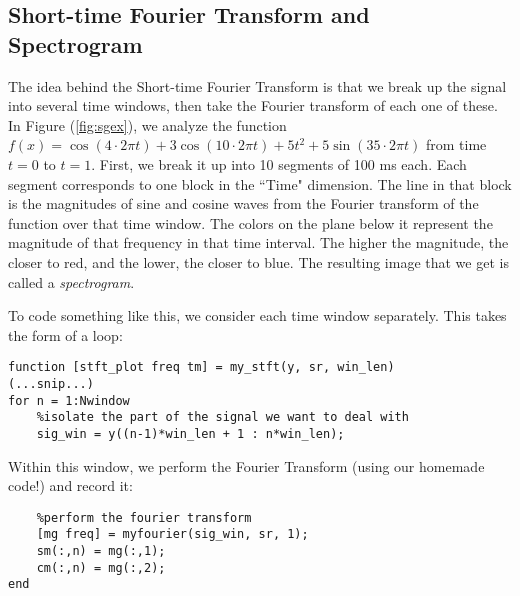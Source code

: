 \documentclass{article}
\begin{document}
\subsection{Short-time Fourier Transform and Spectrogram}
The idea behind the Short-time Fourier Transform is that we break up the signal into several time windows, then take the Fourier transform of each one of these.  In Figure (\ref{fig:sgex}), we analyze the function $f(x) = \cos(4\cdot2\pi t) + 3\cos(10\cdot 2\pi t) + 5t^2 + 5\sin(35\cdot 2\pi t)$ from time $t=0$ to $t=1$.  First, we break it up into 10 segments of 100 ms each.  Each segment corresponds to one block in the ``Time" dimension.  The line in that block is the magnitudes of sine and cosine waves from the Fourier transform of the function over that time window.  The colors on the plane below it represent the magnitude of that frequency in that time interval.  The higher the magnitude, the closer to red, and the lower, the closer to blue.  The resulting image that we get is called a {\it spectrogram}.






To code something like this, we consider each time window separately.  This takes the form of a loop:

\begin{verbatim}
function [stft_plot freq tm] = my_stft(y, sr, win_len)
(...snip...)
for n = 1:Nwindow 
    %isolate the part of the signal we want to deal with
    sig_win = y((n-1)*win_len + 1 : n*win_len);
\end{verbatim}

Within this window, we perform the Fourier Transform (using our homemade code!) and record it:

\begin{verbatim}
    %perform the fourier transform
    [mg freq] = myfourier(sig_win, sr, 1);
    sm(:,n) = mg(:,1);
    cm(:,n) = mg(:,2);
end
\end{verbatim}
\end{document}
